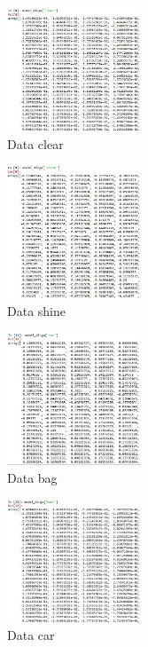\hfill\break
\begin{figure}[H]
\includegraphics[width=4cm]{figures/1174067/5/hasil1-6.jpg}
\centering
\caption{Data clear}
\end{figure}

\hfill\break
\begin{figure}[H]
\includegraphics[width=4cm]{figures/1174067/5/hasil1-7.jpg}
\centering
\caption{Data shine}
\end{figure}

\hfill\break
\begin{figure}[H]
\includegraphics[width=4cm]{figures/1174067/5/hasil1-8.jpg}
\centering
\caption{Data bag}
\end{figure}

\hfill\break
\begin{figure}[H]
\includegraphics[width=4cm]{figures/1174067/5/hasil1-9.jpg}
\centering
\caption{Data car}
\end{figure}

